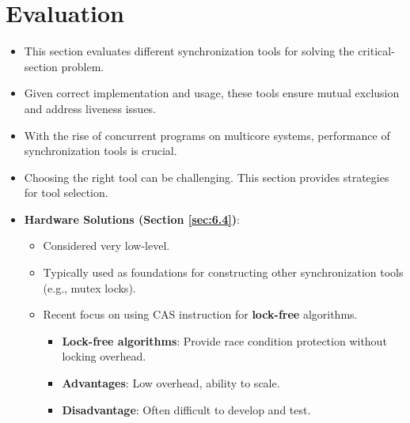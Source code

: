 \section{Evaluation}
\begin{itemize}
    \item This section evaluates different synchronization tools for solving the critical-section problem.
    \item Given correct implementation and usage, these tools ensure mutual exclusion and address liveness issues.
    \item With the rise of concurrent programs on multicore systems, performance of synchronization tools is crucial.
    \item Choosing the right tool can be challenging. This section provides strategies for tool selection.

    \item \textbf{Hardware Solutions (Section \ref{sec:6.4})}:
    \begin{itemize}
        \item Considered very low-level.
        \item Typically used as foundations for constructing other synchronization tools (e.g., mutex locks).
        \item Recent focus on using CAS instruction for \textbf{lock-free} algorithms.
        \begin{itemize}
            \item \textbf{Lock-free algorithms}: Provide race condition protection without locking overhead.
            \item \textbf{Advantages}: Low overhead, ability to scale.
            \item \textbf{Disadvantage}: Often difficult to develop and test.
        \end{itemize}
    \end{itemize}


\end{itemize}

